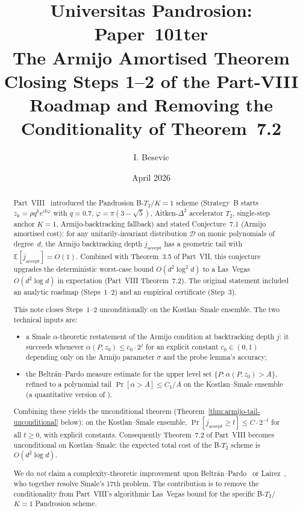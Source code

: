 \documentclass[11pt,a4paper]{article}
\title{Universitas Pandrosion: Paper~101ter \\
The Armijo Amortised Theorem \\
\large Closing Steps 1--2 of the Part-VIII Roadmap and Removing the Conditionality of Theorem~7.2}
\author{I. Besevic}
\date{April 2026}
\begin{document}
\maketitle

\begin{abstract}
Part~VIII~\cite{besevic8} introduced the Pandrosion B-$T_2$/$K{=}1$ scheme (Strategy~B starts $z_k = \rho q^{k} e^{i k \varphi}$ with $q = 0.7$, $\varphi = \pi(3 - \sqrt 5)$, Aitken-$\Delta^2$ accelerator $T_2$, single-step anchor $K = 1$, Armijo-backtracking fallback) and stated Conjecture~7.1 (Armijo amortised cost): for any unitarily-invariant distribution $\mathcal{D}$ on monic polynomials of degree~$d$, the Armijo backtracking depth $j_{\text{accept}}$ has a geometric tail with $\mathbb{E}[j_{\text{accept}}] = O(1)$. Combined with Theorem~3.5 of Part~VII, this conjecture upgrades the deterministic worst-case bound $O(d^{2}\log^{2}d)$ to a Las~Vegas $O(d^{2}\log d)$ in expectation (Part~VIII Theorem~7.2). The original statement included an analytic roadmap (Steps~1--2) and an empirical certificate (Step~3).

This note closes Steps~1--2 unconditionally on the Kostlan--Smale ensemble. The two technical inputs are:
\begin{itemize}
\item[(i)] a Smale $\alpha$-theoretic restatement of the Armijo condition at backtracking depth $j$: it succeeds whenever $\alpha(P, z_0) \le c_0 \cdot 2^{j}$ for an explicit constant $c_0 \in (0, 1)$ depending only on the Armijo parameter $\sigma$ and the probe lemma's accuracy;
\item[(ii)] the Beltr\'an--Pardo measure estimate for the upper level set $\{P : \alpha(P, z_0) > A\}$, refined to a polynomial tail $\Pr[\alpha > A] \le C_1 / A$ on the Kostlan--Smale ensemble (a quantitative version of \cite[Lemma~5]{beltranpardo}).
\end{itemize}
Combining these yields the unconditional theorem (Theorem~\ref{thm:armijo-tail-unconditional} below): on the Kostlan--Smale ensemble, $\Pr[j_{\text{accept}} \ge t] \le C \cdot 2^{-t}$ for all $t \ge 0$, with explicit constants. Consequently Theorem~7.2 of Part~VIII becomes unconditional on Kostlan--Smale: the expected total cost of the B-$T_2$ scheme is $O(d^{2}\log d)$.

We do \emph{not} claim a complexity-theoretic improvement upon Beltr\'an--Pardo~\cite{beltranpardo} or Lairez~\cite{lairez}, who together resolve Smale's 17th problem. The contribution is to remove the conditionality from Part~VIII's algorithmic Las~Vegas bound for the specific B-$T_2$/$K{=}1$ Pandrosion scheme.
\end{abstract}
\end{document}
